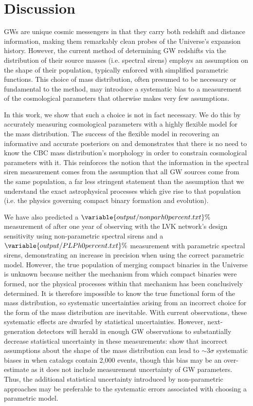 \documentclass[]{aastex631}
\begin{document}
\section{Discussion}
\label{sec:discussion}

\acp{GW} are unique cosmic messengers in that they carry both redshift and distance information, making them remarkably clean probes of the Universe's expansion history. 
However, the current method of determining \ac{GW} redshifts via the distribution of their source masses (i.e. spectral sirens) employs an assumption on the shape of their population, typically enforced with simplified parametric functions. 
This choice of mass distribution, often presumed to be necessary or fundamental to the method, may introduce a systematic bias to a measurement of the cosmological parameters that otherwise makes very few assumptions.
    
In this work, we show that such a choice is not in fact necessary.
We do this by accurately measuring cosmological parameters with a highly flexible model for the mass distribution. 
The success of the flexible model in recovering an informative and accurate posteriors on \Ho{} and \Omm{} demonstrates that there is no need to know the \ac{CBC} mass distribution's morphology in order to constrain cosmological parameters with it.
This reinforces the notion that the information in the spectral siren measurement comes from the assumption that all \ac{GW} sources come from the same population, a far less stringent statement than the assumption that we understand the exact astrophysical processes which give rise to that population (i.e. the physics governing compact binary formation and evolution).
    
We have also predicted a $\variable{output/nonparh0percent.txt}\%$ measurement of \Ho{} after one year of observing with the \ac{LVK} network's design sensitivity using non-parametric spectral sirens and a $\variable{output/PLPh0percent.txt}\%$ 
measurement with parametric spectral sirens, demonstrating an increase in precision when using the correct parametric model.
However, the true population of merging compact binaries in the Universe is unknown because neither the mechanism from which compact binaries were formed, nor the physical processes within that mechanism has been conclusively determined.
It is therefore impossible to know the true functional form of the mass distribution, so systematic uncertainties arising from an incorrect choice for the form of the mass distribution are inevitable.
With current observations, these systematic effects are dwarfed by statistical uncertainties.
However, next-generation detectors will herald in enough \ac{GW} observations to substantially decrease statistical uncertainty in these measurements: \citet{pierra_study_2023} show that incorrect assumptions about the shape of the mass distribution can lead to $\sim3\sigma$ systematic biases in \Ho{} when catalogs contain 2,000 events, though this bias may be an over-estimate as it does not include measurement uncertainty of \ac{GW} parameters.
Thus, the additional statistical uncertainty introduced by non-parametric approaches may be preferable to the systematic errors associated with choosing a parametric model.
\end{document}
